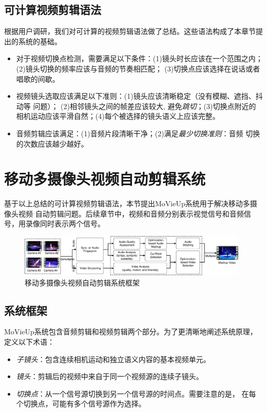\documentclass[doctor]{ustcthesis}
\begin{document}
\subsection{可计算视频剪辑语法}
根据用户调研，我们对可计算的视频剪辑语法做了总结。这些语法构成了本章节提出的系统的基础。
\begin{itemize}\setlength{\itemsep}{-0.4em}
    \item 对于视频切换点检测，需要满足以下条件：(1)镜头时长应该在一个范围之内；
        (2)镜头切换的频率应该与音频的节奏相匹配；
        (3)切换点应该选择在说话或者唱歌的间歇。
    \item 视频镜头选取应该满足以下准则：(1)镜头应该清晰稳定（没有模糊、遮挡、抖动等
        问题）； (2)相邻镜头之间的帧差应该较大, 避免\emph{跳切}；(3)切换点附近的
        相机运动应该平滑自然；(4)每个被选择的镜头语义上应该完整。
    \item 音频剪辑应该满足：(1)音频片段清晰干净；(2)满足\emph{最少切换准则}：音频
        切换的次数应该越少越好。
\end{itemize}

\section{移动多摄像头视频自动剪辑系统}
基于以上总结的可计算视频剪辑语法，本节提出MoVieUp系统用于解决移动多摄像头视频
自动剪辑问题。后续章节中，视频和音频分别表示视觉信号和音频信号，用录像同时表示两个信号。

\begin{figure}[t]
    \centering
    \includegraphics[clip=true, width=0.98\textwidth]{mashup-framework.pdf}
    \caption{移动多摄像头视频自动剪辑系统框架}
    \label{fig:mashup-framework}
    \vspace{-2em}
\end{figure}

\subsection{系统框架}
MoVieUp系统包含音频剪辑和视频剪辑两个部分。为了更清晰地阐述系统原理，定义以下术语：
\vspace{-0.5em}
\begin{itemize}\setlength{\itemsep}{-0.5em}
    \item \emph{子镜头}：包含连续相机运动和独立语义内容的基本视频单元。
    \item \emph{镜头}：剪辑后的视频中来自于同一个视频源的连续子镜头。
    \item \emph{切换点}：从一个信号源切换到另一个信号源的时间点。需要注意的是，
        在每个切换点，可能有多个信号源作为选择。
\end{itemize}
\end{document}
